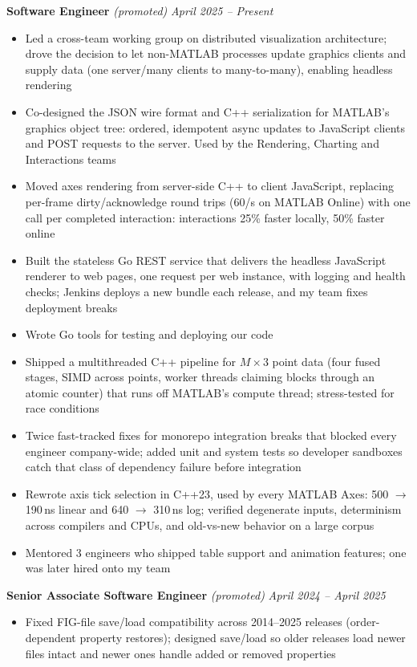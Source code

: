 \documentclass{article}
\begin{document}
{\large \textbf{Software Engineer}} \textit{(promoted)} \hfill \textit{April 2025 -- Present}
\begin{itemize}[leftmargin=*]
    \item Led a cross-team working group on distributed visualization architecture; drove the decision to let non-MATLAB processes update graphics clients and supply data (one server\slash many clients to many-to-many), enabling headless rendering
    \item Co-designed the JSON wire format and C++ serialization for MATLAB's graphics object tree: ordered, idempotent async updates to JavaScript clients and POST requests to the server. Used by the Rendering, Charting and Interactions teams
    \item Moved axes rendering from server-side C++ to client JavaScript, replacing per-frame dirty/acknowledge round trips (60/s on MATLAB Online) with one call per completed interaction: interactions 25\% faster locally, 50\% faster online
    \item Built the stateless Go REST service that delivers the headless JavaScript renderer to web pages, one request per web instance, with logging and health checks; Jenkins deploys a new bundle each release, and my team fixes deployment breaks
    \item Wrote Go tools for testing and deploying our code
    \item Shipped a multithreaded C++ pipeline for $M \times 3$ point data (four fused stages, SIMD across points, worker threads claiming blocks through an atomic counter) that runs off MATLAB's compute thread; stress-tested for race conditions
    \item Twice fast-tracked fixes for monorepo integration breaks that blocked every engineer company-wide; added unit and system tests so developer sandboxes catch that class of dependency failure before integration
    \item Rewrote axis tick selection in C++23, used by every MATLAB Axes: 500 $\to$ 190\,ns linear and 640 $\to$ 310\,ns log; verified degenerate inputs, determinism across compilers and CPUs, and old-vs-new behavior on a large corpus
    \item Mentored 3 engineers who shipped table support and animation features; one was later hired onto my team
\end{itemize}

{\large \textbf{Senior Associate Software Engineer}} \textit{(promoted)} \hfill \textit{April 2024 -- April 2025}
\begin{itemize}[leftmargin=*]
    \item Fixed FIG-file save/load compatibility across 2014--2025 releases (order-dependent property restores); designed save/load so older releases load newer files intact and newer ones handle added or removed properties
\end{itemize}
\end{document}
